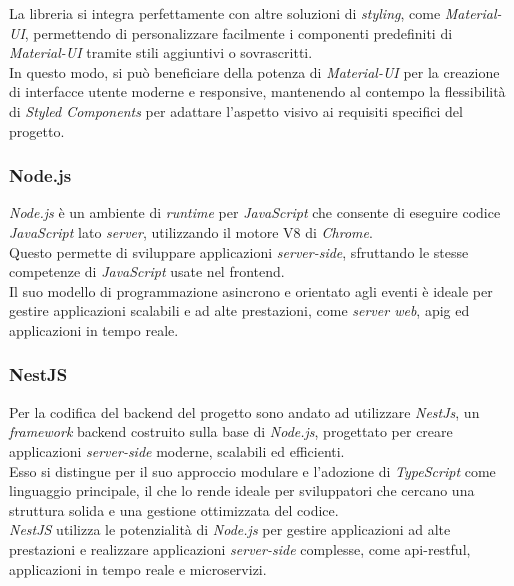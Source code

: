 \noindent La libreria si integra perfettamente con altre soluzioni di \textit{styling}, come \textit{Material-UI}, permettendo di personalizzare facilmente i componenti predefiniti di \textit{Material-UI} tramite stili aggiuntivi o sovrascritti. \\
In questo modo, si può beneficiare della potenza di \textit{Material-UI} per la creazione di interfacce utente moderne e responsive, mantenendo al contempo la flessibilità di \textit{Styled Components} per adattare l’aspetto visivo ai requisiti specifici del progetto. 

\subsubsection{Node.js}

\textit{Node.js} è un ambiente di \textit{runtime} per \textit{JavaScript} che consente di eseguire codice \textit{JavaScript} lato \textit{server}, utilizzando il motore V8 di \textit{Chrome}. \\
Questo permette di sviluppare applicazioni \textit{server-side}, sfruttando le stesse competenze di \textit{JavaScript} usate nel \gls{frontend}. \\
Il suo modello di programmazione asincrono e orientato agli eventi è ideale per gestire applicazioni scalabili e ad alte prestazioni, come \textit{server web}, \gls{apig} ed applicazioni in tempo reale.

\subsubsection{NestJS}

\noindent Per la codifica del \gls{backend} del progetto sono andato ad utilizzare \textit{NestJs}, un \textit{framework} \gls{backend} costruito sulla base di \textit{Node.js}, progettato per creare applicazioni \textit{server-side} moderne, scalabili ed efficienti.\\
Esso si distingue per il suo approccio modulare e l'adozione di \textit{TypeScript} come linguaggio principale, il che lo rende ideale per sviluppatori che cercano una struttura solida e una gestione ottimizzata del codice.\\
\textit{NestJS} utilizza le potenzialità di \textit{Node.js} per gestire applicazioni ad alte prestazioni e realizzare applicazioni \textit{server-side} complesse, come \gls{api-restful}, applicazioni in tempo reale e microservizi.\\

